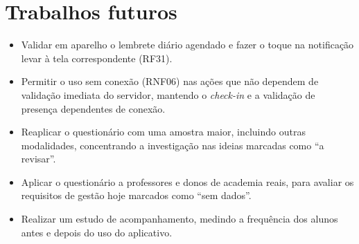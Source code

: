 \section{Trabalhos futuros}

\begin{itemize}
      \item Validar em aparelho o lembrete diário agendado e fazer o toque
        na notificação levar à tela correspondente (RF31).
  \item Permitir o uso sem conexão (RNF06) nas ações que não dependem de
        validação imediata do servidor, mantendo o \textit{check-in} e a
        validação de presença dependentes de conexão.
  \item Reaplicar o questionário com uma amostra maior, incluindo
        outras modalidades, concentrando a investigação nas ideias marcadas
        como ``a revisar''.
  \item Aplicar o questionário a professores e donos de academia reais,
        para avaliar os requisitos de gestão hoje marcados como ``sem
        dados''.
  \item Realizar um estudo de acompanhamento, medindo a frequência dos
        alunos antes e depois do uso do aplicativo.
\end{itemize}
